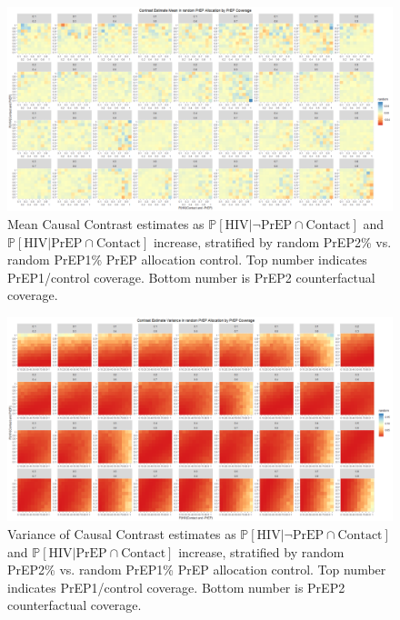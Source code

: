 \documentclass{article}
\theoremstyle{definition}
\begin{document}
\begin{figure}[H]
    \centering
    \includegraphics[width=\linewidth]{Figures/PrEP Random Mean Plots.png}
    \caption{Mean Causal Contrast estimates as $\mathbb{P}\left[\text{HIV} \vert \neg \text{PrEP} \cap \text{Contact}\right]$ and $\mathbb{P}\left[\text{HIV} \vert \text{PrEP} \cap \text{Contact}\right]$ increase, stratified by random PrEP2\% vs. random PrEP1\% PrEP allocation control. Top number indicates PrEP1/control coverage. Bottom number is PrEP2 counterfactual coverage.}
    \label{fig:Figure 19}
\end{figure}
\begin{figure}[H]
    \centering
    \includegraphics[width=\linewidth]{Figures/PrEP Random Variance Plots.png}
    \caption{Variance of Causal Contrast estimates as $\mathbb{P}\left[\text{HIV} \vert \neg \text{PrEP} \cap \text{Contact}\right]$ and $\mathbb{P}\left[\text{HIV} \vert \text{PrEP} \cap \text{Contact}\right]$ increase, stratified by random PrEP2\% vs. random PrEP1\% PrEP allocation control. Top number indicates PrEP1/control coverage. Bottom number is PrEP2 counterfactual coverage.}
    \label{fig:Figure 20}
\end{figure}
\end{document}
